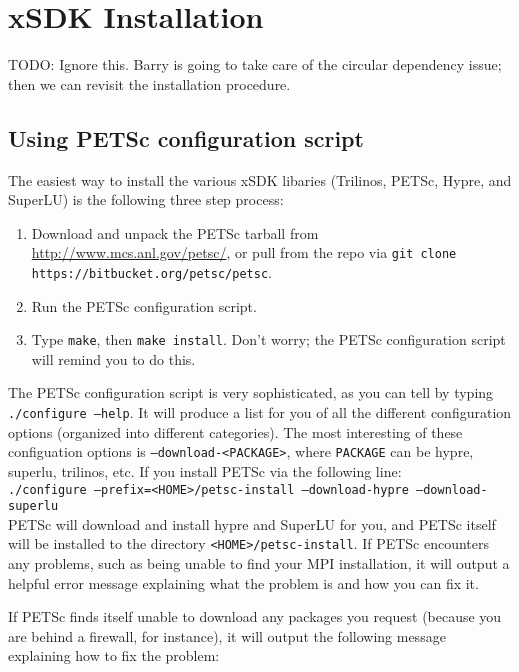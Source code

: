 \chapter{xSDK Installation}
{\color{red}TODO: Ignore this.  Barry is going to take care of the circular
dependency issue; then we can revisit the installation procedure.}

\section{Using PETSc configuration script}
The easiest way to install the various xSDK libaries (Trilinos, PETSc, Hypre,
and SuperLU) is the following three step process:

\begin{enumerate}
  \item Download and unpack the PETSc tarball from
  \url{http://www.mcs.anl.gov/petsc/}, or pull from the repo via {\tt git clone
  https://bitbucket.org/petsc/petsc}.
  \item Run the PETSc configuration script.
  \item Type {\tt make}, then {\tt make install}.  Don't worry; the PETSc
  configuration script will remind you to do this.
\end{enumerate}

The PETSc configuration script is very sophisticated, as you can tell by typing
{\tt ./configure --help}.  It will produce a list for you of all the different
configuration options (organized into different categories).  The most
interesting of these configuation options is {\tt --download-<PACKAGE>}, where
{\tt PACKAGE} can be hypre, superlu, trilinos, etc.  If you install PETSc via
the following line:
\\
{\tt ./configure --prefix=<HOME>/petsc-install --download-hypre
--download-superlu}
\\
PETSc will download and install hypre and SuperLU for you, and PETSc itself will
be installed to the directory {\tt <HOME>/petsc-install}.  If PETSc encounters
any problems, such as being unable to find your MPI installation, it will output
a helpful error message explaining what the problem is and how you can fix it.

If PETSc finds itself unable to download any packages you request (because you
are behind a firewall, for instance), it will output the following message
explaining how to fix the problem:


